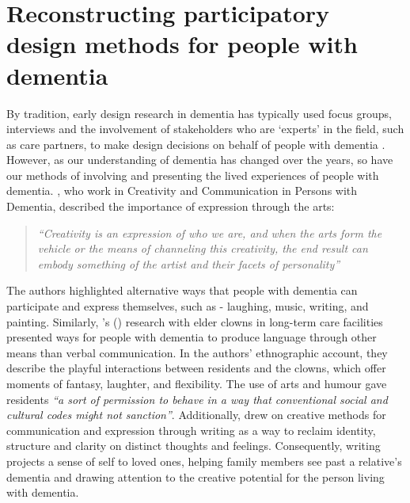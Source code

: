 \section{Reconstructing participatory design methods for people with dementia}
\label{method:DementiaPD}
By tradition, early design research in dementia has typically used focus groups, interviews and the involvement of stakeholders who are `experts’ in the field, such as care partners, to make design decisions on behalf of people with dementia \citep{branco_personalised_2017}. However, as our understanding of dementia has changed over the years, so have our methods of involving and presenting the lived experiences of people with dementia. \cite{john_killick_claire_craig_creativity_2012}, who work in Creativity and Communication in Persons with Dementia, described the importance of expression through the arts: 

\begin{quote}\textit{``Creativity is an expression of who we are, and when the arts form the vehicle or the means of channeling this creativity, the end result can embody something of the artist and their facets of personality''} \citep[p.17]{john_killick_claire_craig_creativity_2012}
\end{quote}

The authors highlighted alternative ways that people with dementia can participate and express themselves, such as - laughing, music, writing, and painting. Similarly, \citeauthor{kontos_presence_2015}'s (\citeyear{kontos_presence_2015}) research with elder clowns in long-term care facilities presented ways for people with dementia to produce language through other means than verbal communication. In the authors' ethnographic account, they describe the playful interactions between residents and the clowns, which offer moments of fantasy, laughter, and flexibility. The use of arts and humour gave residents \textit{``a sort of permission to behave in a way that conventional social and cultural codes might not sanction''}. Additionally, \cite{ryan_dementia_2009} drew on creative methods for communication and expression through writing as a way to reclaim identity, structure and clarity on distinct thoughts and feelings. Consequently, writing projects a sense of self to loved ones, helping family members see past a relative's dementia and drawing attention to the creative potential for the person living with dementia. 


